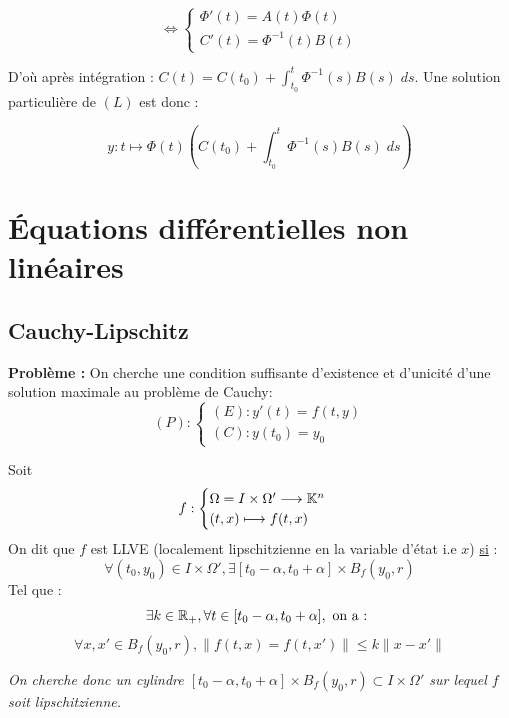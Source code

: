 \[ \iff 
\begin{cases}
	\Phi'(t) = A(t) \Phi(t) \\ 
	C'(t) = \Phi^{-1}(t) B(t)
\end{cases} \] 

D'où après intégration : $ C(t) = C(t_0) + \int_{t_0}^{t} \Phi^{-1}(s) B(s) \; ds $. 
Une solution particulière de $(L)$ est donc :

	\[ \boxed{ y : t \longmapsto \Phi(t) \left( C(t_0) + \int_{t_0}^{t} \Phi^{-1}(s) B(s) \; ds \right) } \] 



\section{Équations différentielles non linéaires}

\subsection{Cauchy-Lipschitz}

\textbf{Problème : } On cherche une condition suffisante d'existence et d'unicité d'une solution maximale au problème 
de Cauchy: 
    \[ (P) : 
        \begin{cases}
            (E) : y'(t) = f(t,y) \\ 
            (C) : y(t_0) = y_0 
        \end{cases}
    \] 

\begin{definition}
    Soit 
        \[ f : 
            \begin{cases}
                \Omega = I \times \Omega' \longrightarrow \mathbb{K}^n \\ 
                (t,x) \longmapsto f(t,x)
            \end{cases} \] 
    On dit que $f$ est LLVE (localement lipschitzienne en la variable d'état i.e $x$) \underline{si} :
        \[ \forall (t_0, y_0) \in I \times \Omega', \exists [t_0 - \alpha, t_0 + \alpha] \times B_f(y_0,r) \] 
    Tel que : 
        \[ \exists k \in \mathbb{R}_+, \forall t \in [t_0 - \alpha, t_0 + \alpha], \text{ on a : } \] 
        \[ \boxed{ \forall x,x' \in B_f(y_0,r), \| f(t,x) = f(t,x') \| \leqslant k \| x - x'\| } \] 
    
    \emph{On cherche donc un cylindre $[t_0 - \alpha, t_0 + \alpha] \times B_f(y_0,r) \subset I \times \Omega'$ sur lequel 
    $f$ soit lipschitzienne.}
\end{definition}

